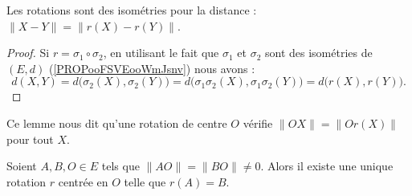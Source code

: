 \begin{lemma}       \label{LEMooTZNWooTVOklu}
	Les rotations sont des isométries pour la distance : \( \| X-Y \|=\| r(X)-r(Y) \|\).
\end{lemma}

\begin{proof}
	Si \( r=\sigma_1\circ\sigma_2\), en utilisant le fait que \( \sigma_1\) et \( \sigma_2\) sont des isométries de \( (E,d)\) (\ref{PROPooFSVEooWmJsnv}) nous avons :
	\begin{equation}
		d(X,Y)=d\big( \sigma_2(X),\sigma_2(Y) \big)=d\big( \sigma_1\sigma_2(X),\sigma_1\sigma_2(Y) \big)=d\big( r(X),r(Y) \big).
	\end{equation}
\end{proof}

Ce lemme nous dit qu'une rotation de centre \( O\) vérifie \( \| OX \|=\| Or(X) \|\) pour tout \( X\).

\begin{proposition}      \label{PROPooNXJKooEDOczh}
	Soient \( A,B,O\in E\) tels que \( \| AO \|=\| BO \|\neq 0\). Alors il existe une unique rotation \( r\) centrée en \( O\) telle que \( r(A)=B\).
\end{proposition}


